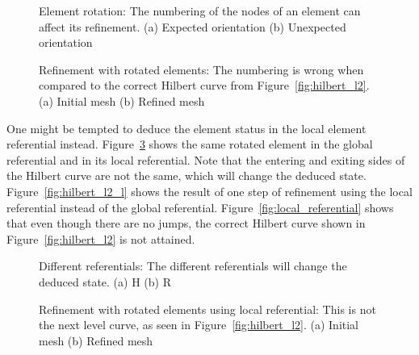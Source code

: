 \begin{figure}[H]
    \centering
    \hfill
    \caption{Element rotation: The numbering of the nodes of an element can affect its refinement. (a) Expected orientation (b) Unexpected orientation}\label{fig:node_order}
\end{figure}

\begin{figure}[H]
    \centering
    \hfill
    \caption{Refinement with rotated elements: The numbering is wrong when compared to the correct Hilbert curve from Figure~\ref{fig:hilbert_l2}. (a) Initial mesh (b) Refined mesh}\label{fig:hilbert_rotated}
\end{figure}

One might be tempted to deduce the element status in the local element referential instead.
Figure~\ref{fig:referentials} shows the same rotated element in the global referential and in its
local referential. Note that the entering and exiting sides of the Hilbert curve are not the same,
which will change the deduced state. Figure~\ref{fig:hilbert_l2_l} shows the result of one step of
refinement using the local referential instead of the global referential.
Figure~\ref{fig:local_referential} shows that even though there are no jumps, the correct Hilbert
curve shown in Figure~\ref{fig:hilbert_l2} is not attained.

\begin{figure}[H]
    \centering
    \hfill
    \caption{Different referentials: The different referentials will change the deduced state. (a) H (b) R}\label{fig:referentials}
\end{figure}

\begin{figure}[H]
    \centering
    \hfill
    \caption{Refinement with rotated elements using local referential: This is not the next level curve, as seen in Figure~\ref{fig:hilbert_l2}. (a) Initial mesh (b) Refined mesh}\label{fig:hilbert_local}
\end{figure}

